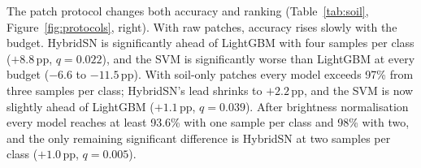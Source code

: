 \documentclass[]{interact}
\newcommand{\pp}{\,pp}
\begin{document}
The patch protocol changes both accuracy and ranking (Table~\ref{tab:soil}, Figure~\ref{fig:protocols}, right). With raw patches, accuracy rises slowly with the budget. HybridSN is significantly ahead of LightGBM with four samples per class ($+8.8$\pp, $q=0.022$), and the SVM is significantly worse than LightGBM at every budget ($-6.6$ to $-11.5$\pp). With soil-only patches every model exceeds 97\% from three samples per class; HybridSN's lead shrinks to $+2.2$\pp, and the SVM is now slightly ahead of LightGBM ($+1.1$\pp, $q=0.039$). After brightness normalisation every model reaches at least 93.6\% with one sample per class and 98\% with two, and the only remaining significant difference is HybridSN at two samples per class ($+1.0$\pp, $q=0.005$).

\begin{table}
{}
\end{table}
\end{document}
